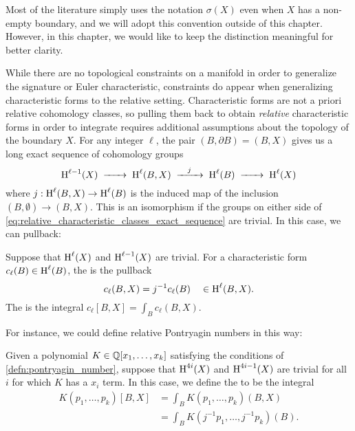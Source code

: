 \begin{convention*}
	Most of the literature simply uses the notation $\sigma(X)$ even when $X$ has a non-empty boundary, and we will adopt this convention outside of this chapter. However, in this chapter, we would like to keep the distinction meaningful for better clarity.
\end{convention*}

While there are no topological constraints on a manifold in order to generalize the signature or Euler characteristic, constraints do appear when generalizing characteristic forms to the relative setting.
Characteristic forms are not a priori relative cohomology classes, so pulling them back to obtain \emph{relative} characteristic forms in order to integrate requires additional assumptions about the topology of the boundary $X$.
For any integer $\ell$, the pair $(B, \partial B) = (B, X)$ gives us a long exact sequence of cohomology groups
\begin{equation}\label{eq:relative_characteristic_classes_exact_sequence}
	\H^{\ell-1}(X) \lkxto \H^{\ell}(B, X) \lkxto[j] \H^{\ell}(B) \lkxto \H^{\ell}(X)
\end{equation}
where $j : \operatorname{H}^{\ell}(B, X) \to \operatorname{H}^{\ell}(B)$ is the induced map of the inclusion $(B,\emptyset) \to (B, X)$. This is an isomorphism if the groups on either side of \cref{eq:relative_characteristic_classes_exact_sequence} are trivial. In this case, we can pullback:

\begin{definition}\label{defn:relative_characteristic_form}
	Suppose that $\operatorname{H}^{\ell}(X)$ and $\operatorname{H}^{\ell-1}(X)$ are trivial. For a characteristic form $c_\ell(B) \in \operatorname{H}^{\ell}(B)$, the  is the pullback
	\[
		c_\ell(B, X) = j^{-1} c_\ell(B) \quad\in \operatorname{H}^{\ell}(B, X).
	\]
	The  is the integral $c_\ell[B,X]=\int_B c_\ell(B,X)$.
\end{definition}

For instance, we could define relative Pontryagin numbers in this way:

\begin{definition}\label{defn:relative_pontryagin_number}
	Given a polynomial $K\in \mathbb{Q}[x_1,\ldots, x_k]$ satisfying the conditions of \cref{defn:pontryagin_number}, suppose that $\operatorname{H}^{4i}(X)$ and $\operatorname{H}^{4i-1}(X)$ are trivial for all $i$ for which $K$ has a $x_i$ term.
	In this case, we define the  to be the integral
	\[
		\begin{aligned}
			K(p_1, \ldots, p_k)[B,X]
			 & = \int_B K(p_1, \ldots, p_k)(B,X)       \\
			 & = \int_B K(j^{-1}p_1, \ldots, j^{-1}p_k)(B).
		\end{aligned}
	\]
\end{definition}

